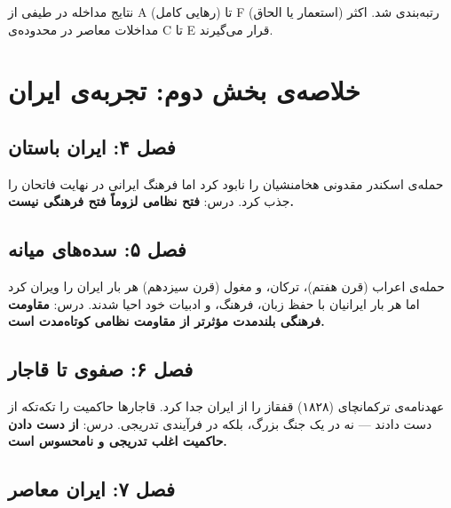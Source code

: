 نتایج مداخله در طیفی از A (رهایی کامل) تا F (استعمار یا الحاق) رتبه‌بندی شد. اکثر مداخلات معاصر در محدوده‌ی C تا E قرار می‌گیرند.


\section{خلاصه‌ی بخش دوم: تجربه‌ی ایران}
\label{sec:app-a-part2}

\subsection{فصل ۴: ایران باستان}
حمله‌ی اسکندر مقدونی هخامنشیان را نابود کرد اما فرهنگ ایرانی در نهایت فاتحان را جذب کرد. درس: \textbf{فتح نظامی لزوماً فتح فرهنگی نیست.}

\subsection{فصل ۵: سده‌های میانه}
حمله‌ی اعراب (قرن هفتم)، ترکان، و مغول (قرن سیزدهم) هر بار ایران را ویران کرد اما هر بار ایرانیان با حفظ زبان، فرهنگ، و ادبیات خود احیا شدند. درس: \textbf{مقاومت فرهنگی بلندمدت مؤثرتر از مقاومت نظامی کوتاه‌مدت است.}

\subsection{فصل ۶: صفوی تا قاجار}
عهدنامه‌ی ترکمانچای (۱۸۲۸) قفقاز را از ایران جدا کرد. قاجارها حاکمیت را تکه‌تکه از دست دادند — نه در یک جنگ بزرگ، بلکه در فرآیندی تدریجی. درس: \textbf{از دست دادن حاکمیت اغلب تدریجی و نامحسوس است.}

\subsection{فصل ۷: ایران معاصر}


